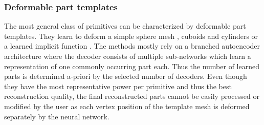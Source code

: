 \subsubsection{Deformable part templates} 
The most general class of primitives can be characterized by deformable part templates.
They learn to deform a simple sphere mesh \cite{NeuralParts_Paschalidou}, cuboids and cylinders \cite{DPF-Net_Shuai} or a learned implicit function \cite{DAE-Net_Chen}.
The methods mostly rely on a branched autoencoder architecture \cite{BAE-Net_Chen} where the decoder consists of multiple sub-networks which learn a representation of one commonly occurring part each.
Thus the number of learned parts is determined a-priori by the selected number of decoders.
Even though they have the most representative power per primitive and thus the best reconstruction quality, the final reconstructed parts cannot be easily processed or modified by the user as each vertex position of the template mesh is deformed separately by the neural network.

